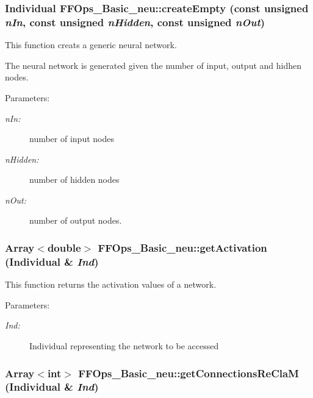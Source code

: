 \subsubsection{\setlength{\rightskip}{0pt plus 5cm}Individual FFOps\_\-Basic\_\-neu::create\-Empty (const unsigned {\em n\-In}, const unsigned {\em n\-Hidden}, const unsigned {\em n\-Out})}\label{classFFOps__Basic__neu_a0}


This function creats a generic neural network.

The neural network is generated given the number of input,  output and hidhen nodes. \begin{Desc}
\item[Parameters: ]\par
\begin{description}
\item[{\em 
n\-In:}]number of input nodes \item[{\em 
n\-Hidden:}]number of hidden nodes \item[{\em 
n\-Out:}]number of output nodes. \end{description}
\end{Desc}
\subsubsection{\setlength{\rightskip}{0pt plus 5cm}Array$<$double$>$ FFOps\_\-Basic\_\-neu::get\-Activation (Individual \& {\em Ind})}\label{classFFOps__Basic__neu_a10}


This function returns the activation values of a network.

\begin{Desc}
\item[Parameters: ]\par
\begin{description}
\item[{\em 
Ind:}]Individual representing the network to be accessed \end{description}
\end{Desc}
\subsubsection{\setlength{\rightskip}{0pt plus 5cm}Array$<$int$>$ FFOps\_\-Basic\_\-neu::get\-Connections\-Re\-Cla\-M (Individual \& {\em Ind})}\label{classFFOps__Basic__neu_a1}


